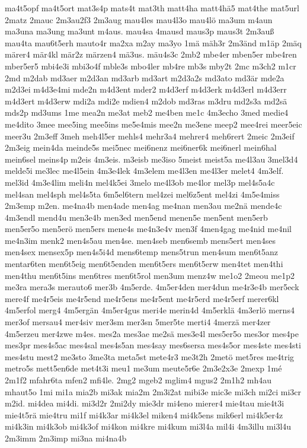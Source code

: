 {ma4t5opf
ma4t5ort
mat3s4p
mats4t
mat3th
matt4ha
matt4hä5
mat4the
mat5url
2matz
2mauc
2m3au2f3
2m3aug
mau4les
mau4l3o
mau4lö
ma3um
m4aun
ma3una
ma3ung
ma3unt
m4aus.
mau4sa
4mausd
maus3p
maus3t
2m3auß
mau4ta
mau6t5erh
mauto4r
ma2xa
m2ay
ma3yo
1mä
mäh3r
2m3änd
m1äp
2mäq
märer4
mär4kl
mär2z
märzen4
mä3us.
mäu4s3c
2mb2
mbe4er
mben5er
mbe4ren
mber5er5
mbi4e3i
mbi3o4f
mble3s
mbo4ler
mb4re
mb3s
mby2t
2mc
m3ch2
m1cr
2md
m2dab
md3aer
m2d3an
md3arb
md3art
m2d3a2s
md3ato
md3är
mde2a
m2d3ei
m4d3e4mi
mde2n
m4d3ent
mder2
m4d3erf
m4d3erk
m4d3erl
m4d3err
m4d3ert
m4d3erw
mdi2a
mdi2e
mdien4
m2dob
md3ras
m3dru
md2s3a
md2sä
mds2p
md3ums
1me
mea2n
me3at
meb2
me4ben
me1c
4m3echo
3med
medie4
me4dito
3mee
mee5ing
mee5ins
me5e4mis
mee2n
me3ene
meep2
mee4rei
meer5eic
meer3u
2m3eff
3meh
meh4l5er
mehls4
mehr3a4
mehrer4
meh6rert
2meic
2m3eif
2m3eig
mein4da
meinde5s
mei5nec
mei6nenz
mei6ner6k
mei6nerl
mein6hal
mein6sel
meins4p
m2eis
4m3eis.
m3eisb
me3iso
5meist
meist5a
me4l3au
3mel3d4
melde5i
me3lec
me4l5ein
4m3e4lek
4m3elem
me4l3en
me4l3er
melet4
4m3elf.
mel3id
4m3e4lim
meli4n
mel4k5ei
3melo
me4l3ob
me4lor
mel3p
mel4s5a4c
mel4san
mel4sph
mel4s5ta
6m5el6tern
mel4zei
mel6z5ent
mel4zi
4m5e4miss
2m3emp
m2en.
me4na4b
men4ade
men4ag
me4nan
men3au
me2nä
mende4c
4m3endl
mend4u
men3e4b
men3ed
men5end
menen5e
men5ent
men5erb
men5er5o
men5erö
men5ers
mene4s
me4n3e4v
men3f
4men4gag
me4nid
me4nil
me4n3im
menk2
men4s5au
men4se.
men4seb
men6semb
mens5ert
men4ses
men4sex
mensex5p
men4s5i4d
mens6temp
mens5trun
men4sum
men6t5anz
mentar6ten
men6t5eig
men6t5enden
men6t5ers
men6t5erw
men4tet
men4thi
men4thu
men6t5ins
men6tres
men6t5rol
men3um
menz4w
me1o2
2meou
me1p2
me3ra
mera3s
merauto6
mer3b
4m5erde.
4m5er4den
mer4dun
me4r3e4b
mer5eck
mere4f
me4r5eis
me4r5end
me4r5ens
me4r5ent
me4r5erd
me4r5erf
merer6kl
4m5erfol
merg4
4m5ergän
4m5er4gus
meri4e
merin4d
4m5erklä
4m3erlö
merns4
mer3of
mersau4
mer4siv
mer3sm
mer3sn
5mer5te
merti4
4merzä
mer4zer
4m5erzeu
mer4zwe
m4es.
mes2a
mes3ae
me2sä
mes3e4l
mes5er5o
mes3or
mes4pe
mes3pr
mes4s5ac
mes4sal
mes4s5an
mes4say
mes6sersa
mes4s5or
mes4ste
mes4sti
mes4stu
mest2
me3sto
3me3ta
meta5st
mete4r3
me3t2h
2metö
met5res
me4trig
metro5s
mett5en6de
met4t3i
meu1
me3um
meute5r6e
2m3e2x3e
2mexp
1mé
2m1f2
mfahr6ta
mfen2
mfi4le.
2mg2
mgeb2
mglim4
mgus2
2m1h2
mh4au
mhaut5o
1mi
mi1a
mia2b
mi3ak
mia2m
2m3i2at
mibi3e
mic3e
mi3ch
mi2ci
mi3cr
m2id.
mi4dea
mi4di.
mi3d2r
2mi2dy
mie3dr
mi4eno
mierer4
mie4tau
mie4t3i
mie4t5rä
mie4tru
mi1f
mi4k3ar
mi4k3el
miken4
mi4k5ens
mik6erl
mi4k5er4z
mi4k3in
mi4k3ob
mi4k3of
mi4kon
mi4kre
mi4kum
mi3l4a
mil4i
4m3illu
mi3l4u
2m3imm
2m3imp
mi3na
mi4na4b
}
